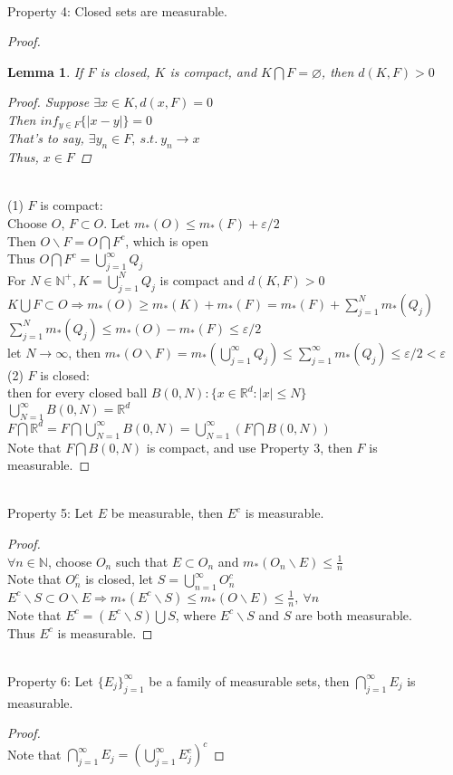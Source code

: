 \documentclass{article}
\newtheorem{lemma}{Lemma}
\begin{document}
~\\
Property 4: Closed sets are measurable. 
\begin{proof}
	\begin{lemma}
		If $F$ is closed, $K$ is compact, and $K\bigcap F=\varnothing$, then $d(K, F)>0$
		\begin{proof}
			Suppose $\exists x\in K, d(x,F)=0$\\
			Then $inf_{y\in F}\{\left|x-y\right|\}=0$\\
			That's to say, $\exists y_{n}\in F,\ s.t.\ y_{n}\rightarrow x$\\
			Thus, $x\in F$
		\end{proof}
	\end{lemma}
	~\\
	(1) $F$ is compact: \\
	Choose $O$, $F\subset O$. 
	Let $m_{*}(O)\leq m_{*}(F)+\varepsilon/2$\\
	Then $O\backslash F=O\bigcap F^{c}$, which is open\\
	Thus $O\bigcap F^{c}=\bigcup_{j=1}^{\infty}Q_{j}$\\
	For $N\in \mathbb{N}^{+}, K=\bigcup_{j=1}^{N}Q_{j}$ is compact and $d(K, F)>0$\\
	$K \bigcup F\subset O \Rightarrow m_{*}(O)\geq m_{*}(K)+m_{*}(F)=m_{*}(F)+\sum_{j=1}^{N}m_{*}(Q_{j})$\\
	$\sum_{j=1}^{N}m_{*}(Q_{j})\leq m_{*}(O)-m_{*}(F)\leq \varepsilon/2$\\
	let $N\rightarrow \infty$, then $m_{*}(O\backslash F)=m_{*}(\bigcup_{j=1}^{\infty}Q_{j})\leq \sum_{j=1}^{\infty}m_{*}(Q_{j})\leq \varepsilon/2<\varepsilon$\\
	(2) $F$ is closed: \\
	then for every closed ball $B(0, N):\{x\in \mathbb{R}^{d}: \left|x\right|\leq N\}$\\
	$\bigcup_{N=1}^{\infty}B(0,N)=\mathbb{R}^{d}$\\
	$F\bigcap \mathbb{R}^{d}=F\bigcap \bigcup_{N=1}^{\infty}B(0,N)=\bigcup_{N=1}^{\infty}(F\bigcap B(0,N))$\\
	Note that $F\bigcap B(0,N)$ is compact, and use Property 3, then $F$ is measurable. 
\end{proof}
~\\
Property 5: Let $E$ be measurable, then $E^{c}$ is measurable. 
\begin{proof}
	~\\
	$\forall n\in \mathbb{N}$, choose $O_{n}$ such that $E\subset O_{n}$ and $m_{*}(O_{n}\backslash E)\leq \frac{1}{n}$\\
	Note that $O_{n}^{c}$ is closed, let $S=\bigcup_{n=1}^{\infty}O_{n}^{c}$\\
	$E^{c}\backslash S\subset O\backslash E\Rightarrow m_{*}(E^{c}\backslash S)\leq m_{*}(O\backslash E)\leq \frac{1}{n},\ \forall n$\\
	Note that $E^{c}=(E^{c}\backslash S)\bigcup S$, where $E^{c}\backslash S$ and $S$ are both measurable. \\
	Thus $E^{c}$ is measurable. 
\end{proof}
~\\
Property 6: Let $\{E_{j}\}_{j=1}^{\infty}$ be a family of measurable sets, then $\bigcap_{j=1}^{\infty}E_{j}$ is measurable. 
	\begin{proof}
		~\\
		Note that $\bigcap_{j=1}^{\infty}E_{j}=(\bigcup_{j=1}^{\infty}E_{j}^{c})^{c}$
	\end{proof}
\end{document}
